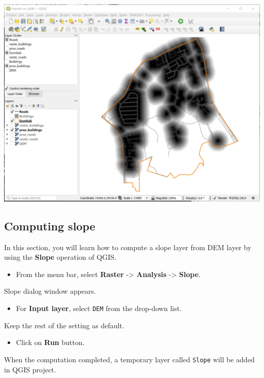 \documentclass[
  letterpaper,
  DIV=11,
  numbers=noendperiod]{scrreprt}
\providecommand{\tightlist}{%
  \setlength{\itemsep}{0pt}\setlength{\parskip}{0pt}}\usepackage{longtable,booktabs,array}
\begin{document}
\includegraphics{./img07/image28.jpg}

\hypertarget{computing-slope}{%
\subsection{Computing slope}\label{computing-slope}}

In this section, you will learn how to compute a slope layer from DEM
layer by using the \textbf{Slope} operation of QGIS.

\begin{itemize}
\tightlist
\item
  From the menu bar, select \textbf{Raster} -\textgreater{}
  \textbf{Analysis} -\textgreater{} \textbf{Slope}.
\end{itemize}

Slope dialog window appears.

\begin{itemize}
\tightlist
\item
  For \textbf{Input layer}, select \texttt{DEM} from the drop-down list.
\end{itemize}

Keep the rest of the setting as default.

\begin{itemize}
\tightlist
\item
  Click on \textbf{Run} button.
\end{itemize}

When the computation completed, a temporary layer called \texttt{Slope}
will be added in QGIS project.
\end{document}
